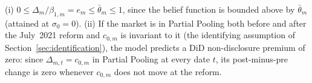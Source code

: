 \label{lem:model_bounds}
(i) $0\le\Delta_m/\beta_{1,m}=e_m\le\bar\theta_m\le1$, since the belief function is bounded
above by $\bar\theta_m$ (attained at $\sigma_0=0$). (ii) If the market is in Partial Pooling both before and after the July~2021 reform and $c_{0,m}$ is
invariant to it (the identifying assumption of
Section~\ref{sec:identification}), the model predicts a DiD non-disclosure premium of zero:
since $\Delta_{m,t}=c_{0,m}$ in Partial Pooling at every date $t$, its post-minus-pre change is
zero whenever $c_{0,m}$ does not move at the reform.
